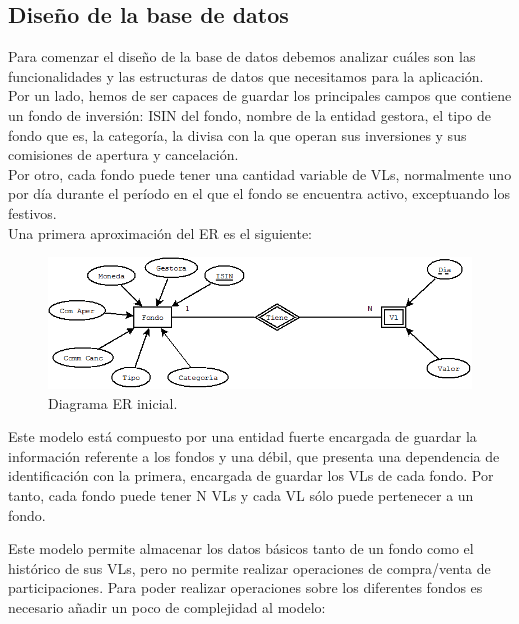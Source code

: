 \documentclass[12pt, a4paper]{article}
\begin{document}
\subsection{Diseño de la base de datos}
Para comenzar el diseño de la base de datos debemos analizar cuáles son las funcionalidades y las estructuras de datos que necesitamos para la aplicación.\\

Por un lado, hemos de ser capaces de guardar los principales campos que contiene un fondo de inversión: \gls{ISIN} del fondo, nombre de la entidad gestora, el tipo de fondo que es, la categoría, la divisa con la que operan sus inversiones y sus comisiones de apertura y cancelación.\\

Por otro, cada fondo puede tener una cantidad variable de \gls{VL}s, normalmente uno por día durante el período en el que el fondo se encuentra activo, exceptuando los festivos.\\

Una primera aproximación del \gls{ER} es el siguiente:\\



\begin{figure}[htbp]
	\centering
	\includegraphics[width=\textwidth]{figuras/ERSimple.png}
	\caption{Diagrama ER inicial.}
	\label{fig:erinicial}
\end {figure}

Este modelo está compuesto por una entidad fuerte encargada de guardar la información referente a los fondos y una débil, que presenta una dependencia de identificación con la primera, encargada de guardar los \gls{VL}s de cada fondo. Por tanto, cada fondo puede tener N \gls{VL}s y cada \gls{VL} sólo puede pertenecer a un fondo.

\newpage

Este modelo permite almacenar los datos básicos tanto de un fondo como el histórico de sus \gls{VL}s, pero no permite realizar operaciones de compra/venta de participaciones. Para poder realizar operaciones sobre los diferentes fondos es necesario añadir un poco de complejidad al modelo:
\end{document}
